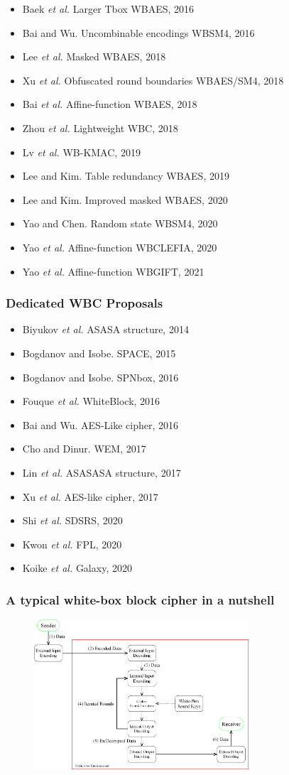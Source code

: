 \documentclass{beamer}
\begin{document}
\frame
{
 \begin{itemize}
  \item Baek \textit{et al.} Larger Tbox WBAES, 2016
  \item Bai and Wu. Uncombinable encodings WBSM4, 2016
  \item Lee \textit{et al.} Masked WBAES, 2018
  \item Xu \textit{et al.} Obfuscated round boundaries WBAES/SM4, 2018
  \item Bai \textit{et al.} Affine-function WBAES, 2018
  \item Zhou \textit{et al.} Lightweight WBC, 2018
  \item Lv \textit{et al.} WB-KMAC, 2019
  \item Lee and Kim. Table redundancy WBAES, 2019
  \item Lee and Kim. Improved masked WBAES, 2020
  \item Yao and Chen. Random state WBSM4, 2020
  \item Yao \textit{et al.} Affine-function WBCLEFIA, 2020
  \item Yao \textit{et al.} Affine-function WBGIFT, 2021
 \end{itemize}
}

\frame
{
 \frametitle{Dedicated WBC Proposals}
 \begin{itemize}
  \item Biyukov \textit{et al.} ASASA structure, 2014
  \item Bogdanov and Isobe. SPACE, 2015
  \item Bogdanov and Isobe. SPNbox, 2016
  \item Fouque \textit{et al.} WhiteBlock, 2016
  \item Bai and Wu. AES-Like cipher, 2016
  \item Cho and Dinur. WEM, 2017
  \item Lin \textit{et al.} ASASASA structure, 2017
  \item Xu \textit{et al.} AES-like cipher, 2017
  \item Shi \textit{et al.} SDSRS, 2020
  \item Kwon \textit{et al.} FPL, 2020
  \item Koike \textit{et al.} Galaxy, 2020
 \end{itemize}
}

\frame
{
\frametitle{A typical white-box block cipher in a nutshell}
\begin{figure}[htbp]
\centering
  \includegraphics[width=8cm]{./pics/WBCrypto_Functional_Model.png}

\end{figure}

}
\end{document}
